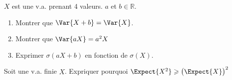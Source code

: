 \documentclass[main.tex]{subfiles}
\begin{document}
 \begin{exercise} $X$ est une v.a. prenant 4 valeurs.  $a$ et $b\in\mathbb{R}$.
	\begin{enumerate}[label={\arabic*)},leftmargin=*]  
 		\item Montrer que $\Var{X+b}=\Var{X}$.
 		\item Montrer que $\Var{aX}=a^2X$
 		\item Exprimer $\sigma(aX+b)$ en fonction de $\sigma(X)$.
 	\end{enumerate}
 \end{exercise}
\begin{exercise} Soit une v.a. finie $X$. Expriquer pourquoi  $\Expect{X^2}\geqslant \big(\Expect{X}\big)^2$ 
\end{exercise} 
%	 
\end{document}
